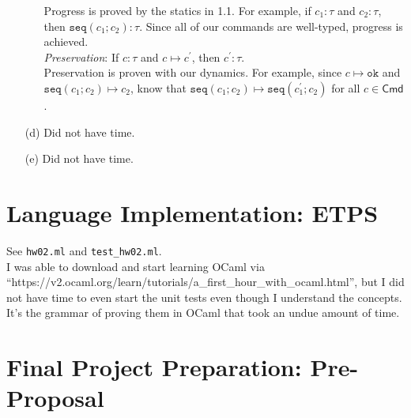 \documentclass[11pt]{exam}
\newcommand{\fmtkw}[1]{\mathtt{#1}}
\newcommand{\typ}{\ensuremath{\mathit{\tau}}}
\newcommand{\Cmd}{\ensuremath{\mathsf{Cmd}}}
\newcommand{\cmd}{\ensuremath{\mathit{c}}}
\newcommand{\seqa}[2]{\ensuremath{\fmtkw{seq}(#1; #2)}}
\newcommand{\ETPS}{\textbf{\textsf{ETPS}}\xspace}
\newcommand{\hasType}[2]{\ensuremath{#1 : #2}}
\newcommand{\step}[2]{\ensuremath{#1 \longmapsto #2}}
\begin{document}
\begin{questions}
\begin{itemize}
\begin{itemize}
                Progress is proved by the statics in 1.1. For example, if $\hasType{\cmd_1}{\typ}$ and $\hasType{\cmd_2}{\typ}$, then $\hasType{\seqa{\cmd_1}{\cmd_2}}{\typ}$. Since all of our commands are well-typed, progress is achieved. \\

                \textit{Preservation}: If $\hasType{\cmd}{\typ}$ and $\step{\cmd}{\cmd^\prime}$, then $\hasType{\cmd^\prime}{\typ}$. \\

                Preservation is proven with our dynamics. For example, since $\step{\cmd}{\texttt{ok}}$ and $\step{\seqa{\cmd_1}{\cmd_2}}{\cmd_2}$, know that $\step{\seqa{\cmd_1}{\cmd_2}}{\seqa{\cmd_1^\prime}{\cmd_2}}$ for all $\cmd \in \Cmd$.
            \end{itemize}
        \item[(d)] Did not have time.
        \item[(e)] Did not have time.
    \end{itemize}
\end{questions}

\section{Language Implementation: \ETPS}

See \texttt{hw02.ml} and \texttt{test\_hw02.ml}. \\

I was able to download and start learning OCaml via ``https://v2.ocaml.org/learn/tutorials/a\_first\_hour\_with\_ocaml.html'', but I did not have time to even start the unit tests even though I understand the concepts. It's the grammar of proving them in OCaml that took an undue amount of time.

\section{Final Project Preparation: Pre-Proposal}
\end{document}
